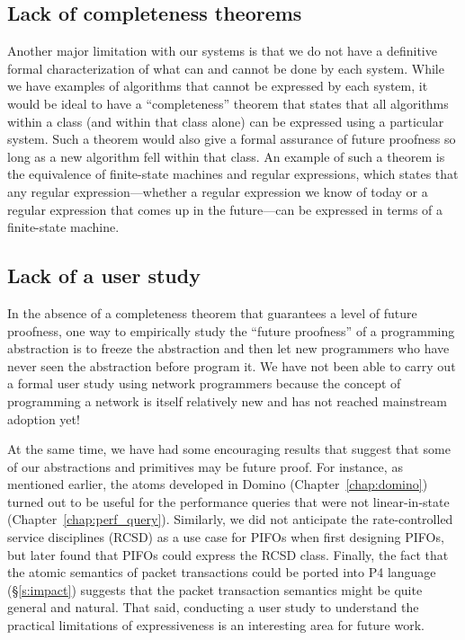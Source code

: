 \subsection{Lack of completeness theorems} Another major limitation with our systems
is that we do not have a definitive formal characterization of what can and
cannot be done by each system. While we have examples of algorithms that cannot
be expressed by each system, it would be ideal to have a ``completeness''
theorem that states that all algorithms within a class (and within that class
alone) can be expressed using a particular system. Such a theorem would also
give a formal assurance of future proofness so long as a new algorithm fell
within that class. An example of such a theorem is the equivalence of
finite-state machines and regular expressions, which states that any regular
expression---whether a regular expression we know of today or a regular
expression that comes up in the future---can be expressed in terms of a
finite-state machine.

\subsection{Lack of a user study} In the absence of a completeness theorem that
guarantees a level of future proofness, one way to empirically study the
``future proofness'' of a programming abstraction is to freeze the abstraction
and then let new programmers who have never seen the abstraction before program
it. We have not been able to carry out a formal user study using network
programmers because the concept of programming a network is itself relatively
new and has not reached mainstream adoption yet!

At the same time, we have had some encouraging results that suggest that some
of our abstractions and primitives may be future proof. For instance, as
mentioned earlier, the atoms developed in Domino (Chapter~\ref{chap:domino})
turned out to be useful for the performance queries that were not
linear-in-state (Chapter~\ref{chap:perf_query}). Similarly, we did not
anticipate the rate-controlled service disciplines (RCSD) as a use case for
PIFOs when first designing PIFOs, but later found that PIFOs could express the
RCSD class. Finally, the fact that the atomic semantics of  packet
transactions could be ported into P4 language (\S\ref{s:impact}) suggests that the packet
transaction semantics might be quite general and natural. That said, conducting
a user study to understand the practical limitations of expressiveness is an
interesting area for future work.

